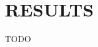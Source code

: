 \documentclass[cs,msthesis]{usuthesis}
\begin{document}
    

    \body  %
    \chapter{RESULTS}\label{ch:results}
    \thispagestyle{empty}
    TODO

    
\end{document}
